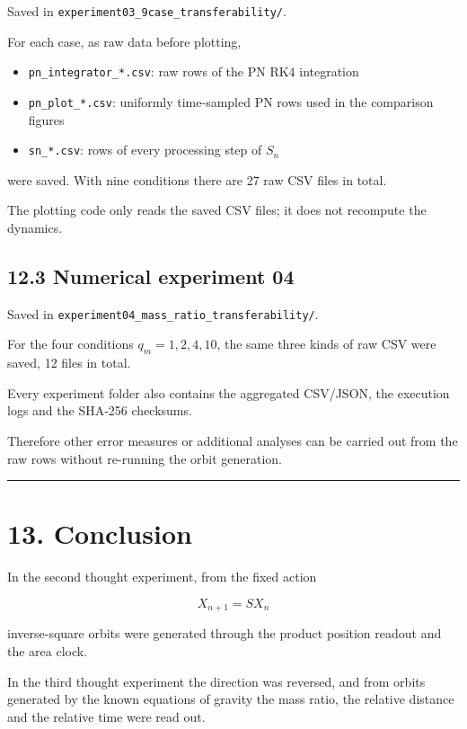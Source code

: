 \documentclass[
  a4paper,
]{article}
\providecommand{\tightlist}{%
  \setlength{\itemsep}{0pt}\setlength{\parskip}{0pt}}
\begin{document}
Saved in \texttt{experiment03\_9case\_transferability/}.

For each case, as raw data before plotting,

\begin{itemize}
\tightlist
\item
  \texttt{pn\_integrator\_*.csv}: raw rows of the PN RK4 integration
\item
  \texttt{pn\_plot\_*.csv}: uniformly time-sampled PN rows used in the
  comparison figures
\item
  \texttt{sn\_*.csv}: rows of every processing step of \(S_n\)
\end{itemize}

were saved. With nine conditions there are 27 raw CSV files in total.

The plotting code only reads the saved CSV files; it does not recompute
the dynamics.

\subsection{12.3 Numerical experiment 04}\label{numerical-experiment-04}

Saved in \texttt{experiment04\_mass\_ratio\_transferability/}.

For the four conditions \(q_m=1,2,4,10\), the same three kinds of raw
CSV were saved, 12 files in total.

Every experiment folder also contains the aggregated CSV/JSON, the
execution logs and the SHA-256 checksums.

Therefore other error measures or additional analyses can be carried out
from the raw rows without re-running the orbit generation.

\begin{center}\rule{0.5\linewidth}{0.5pt}\end{center}

\section{13. Conclusion}\label{conclusion}

In the second thought experiment, from the fixed action

\[
X_{n+1}=SX_n
\]

inverse-square orbits were generated through the product position
readout and the area clock.

In the third thought experiment the direction was reversed, and from
orbits generated by the known equations of gravity the mass ratio, the
relative distance and the relative time were read out.
\end{document}
